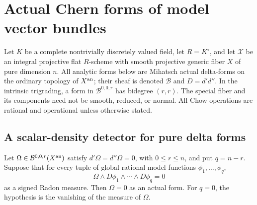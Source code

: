 \section{Actual Chern forms of model vector bundles}
\label{r10c:section}

Let $K$ be a complete nontrivially discretely valued field, let
$R=K^\circ$, and let $\mathcal X$ be an integral projective flat
$R$-scheme with smooth projective generic fiber $X$ of pure dimension $n$.
All analytic forms below are Mihatsch actual delta-forms on the ordinary
topology of $X^{\rm an}$; their sheaf is denoted $\mathcal B$ and
$D=d'd''$.  In the intrinsic trigrading, a form in
$\mathcal B^{0,0,r}$ has bidegree $(r,r)$.
The special fiber and its components need not be smooth, reduced, or
normal.  All Chow operations are rational and operational unless
otherwise stated.

\subsection{A scalar-density detector for pure delta forms}

\begin{lemma}
\label{r10c:detector}
Let $\Omega\in\mathcal B^{0,0,r}(X^{\rm an})$ satisfy
$d'\Omega=d''\Omega=0$, with $0\leq r\leq n$, and put $q=n-r$.  Suppose that for every
tuple of global rational model functions $\phi_1,\ldots,\phi_q$,
\[
                 \Omega\wedge D\phi_1\wedge\cdots\wedge D\phi_q=0
\]
as a signed Radon measure.  Then $\Omega=0$ as an actual form.
For $q=0$, the hypothesis is the vanishing of the measure of $\Omega$.
\end{lemma}

